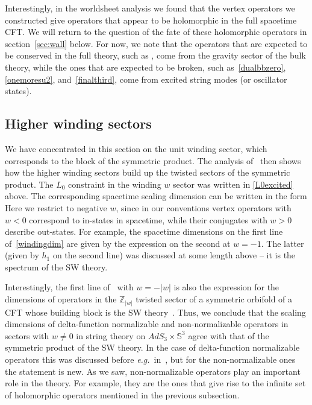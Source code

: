 \documentclass[12pt]{article}
\def\[{\left[}
\def\eg{{e.g.}}
\def\ST{{\sst\it\! ST}}
\def\osc{{\rm osc}}
\newcommand{\bS}{{\mathbb S}}
\newcommand{\bZ}{{\mathbb Z}}
\numberwithin{equation}{section}
\def\eg{{\it e.g.}}
\def\sst{\scriptscriptstyle}
\def\eg{{\it e.g.}}
\begin{document}
Interestingly, in the worldsheet analysis we found that the vertex operators we constructed give operators that appear to be holomorphic in the full spacetime CFT. We will return to the question of the fate of these holomorphic operators in section~\ref{sec:wall} below. For now, we note that the operators that are expected to be conserved in the full theory, such as \dualcurr, come from the gravity sector of the bulk theory, while the ones that are expected to be broken, such as~\eqref{dualbbzero}, \eqref{onemoresu2}, and~\eqref{finalthird}, come from excited string modes (or oscillator states).






\subsection{Higher winding sectors }
\label{sec:higherwinding}


We have concentrated in this section on the unit winding sector, which corresponds to the block of the symmetric product. The analysis of~ then shows how the higher winding sectors build up the twisted sectors of the symmetric product.  The $L_0$ constraint in the winding $w$ sector was written in \eqref{L0excited} above. The corresponding spacetime scaling dimension  can be written in the form 
\eqna[windingdim]{
h_{\ST} &= -\Big(m + \frac{k}{2} w\Big) = -\Big[\frac{h_1}w + \frac k4\Big( w-\frac 1w \Big) \Big]~,
\\[.2cm]
h_1 &= -\frac{j(j-1)}{k} +\frac{j'(j'+1)}{n} + \big(N_\osc-\delta_0\big) + \frac{k}4  ~.
}
Here we restrict to negative $w$, since in our conventions vertex operators with $w<0$ correspond to in-states in spacetime, while their conjugates with $w>0$ describe out-states.  For example, the spacetime dimensions on the first line of~\eqref{windingdim} are given by the expression on the second at $w=-1$. The latter (given by $h_1$ on the second line) was discussed at some length above -- it is the spectrum of the SW theory. 

Interestingly, the first line of \windingdim\ with $w=-|w|$ is also the expression for the dimensions of operators in the  $\bZ_{|w|}$ twisted sector of a symmetric orbifold of a CFT whose building block is the SW theory~. Thus, we conclude that the scaling dimensions of delta-function normalizable and non-normalizable operators in sectors with $w\not=0$ in string theory on $AdS_3\times \bS^3$ agree with that of the symmetric product of the SW theory. In the case of delta-function normalizable operators this was discussed before \eg\ in~, but for the non-normalizable ones the statement is new. As we saw, non-normalizable operators play an important role in the theory. For example, they are the ones that give rise to the infinite set of holomorphic operators mentioned in the previous subsection.
\end{document}
